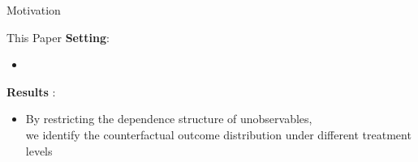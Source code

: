 \documentclass[aspectratio=1610, 9pt]{beamer}
\begin{document}
\begin{frame}{Motivation}
\begin{itemize}




\end{itemize}

\end{frame}




\begin{frame}{This Paper}
\textbf{Setting}:
\vspace{0.1cm}
    \begin{itemize}
        \item 
    \end{itemize}
\vspace{0.5cm}
\textbf{Results} :  
\vspace{0.1cm}
\begin{itemize}

\item By restricting the dependence structure of unobservables, \\ we identify the counterfactual outcome distribution under different treatment levels
        
    \end{itemize}
 
   
\end{frame}
\end{document}
